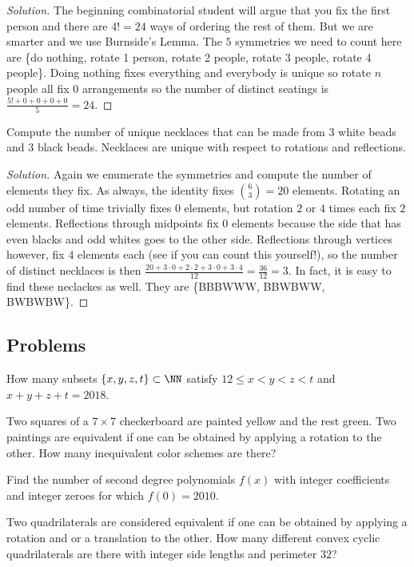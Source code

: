 \documentclass[letterpaper]{article}
\begin{document}
\begin{proof}[Solution]
The beginning combinatorial student will argue that you fix the first person and
there are $4! = 24$ ways of ordering the rest of them. But we are smarter and we
use Burnside's Lemma. The $5$ symmetries we need to count here are \{do nothing,
rotate 1 person, rotate 2 people, rotate 3 people, rotate 4 people\}. Doing
nothing fixes everything and everybody is unique so rotate $n$ people all fix
$0$ arrangements so the number of distinct seatings is $\frac{5! + 0 + 0 + 0 +
0}{5} = 24$.
\end{proof}

\begin{ex}
Compute the number of unique necklaces that can be made from $3$ white beads and
$3$ black beads. Necklaces are unique with respect to rotations and reflections.
\end{ex}

\begin{proof}[Solution]
Again we enumerate the symmetries and compute the number of elements they fix.
As always, the identity fixes $\binom{6}{3} = 20$ elements.  Rotating an odd
number of time trivially fixes $0$ elements, but rotation $2$ or $4$ times each
fix $2$ elements. Reflections through midpoints fix $0$ elements because the
side that has even blacks and odd whites goes to the other side. Reflections
through vertices however, fix $4$ elements each (see if you can count this
yourself!), so the number of distinct necklaces is then $\frac{20 + 3 \cdot 0 +
2 \cdot 2 + 3 \cdot 0 + 3 \cdot 4}{12} = \frac{36}{12} = 3$. In fact, it is easy
to find these neclackes as well. They are \{BBBWWW, BBWBWW, BWBWBW\}.
\end{proof}

\subsection{Problems}

\begin{prb}
How many subsets $\lbrace x, y, z, t \rbrace \subset \NN$ satisfy $12 \leq x < y
< z < t$ and $x + y + z + t = 2018$.
\end{prb}

\begin{prb}[1996 AIME]
Two squares of a $7 \times 7$ checkerboard are painted yellow and the rest
green. Two paintings are equivalent if one can be obtained by applying a
rotation to the other. How many inequivalent color schemes are there?
\end{prb}

\begin{prb}[2010 AIME II-10]
Find the number of second degree polynomials $f(x)$ with integer coefficients
and integer zeroes for which $f(0) = 2010$.
\end{prb}

\begin{prb}[2010 AMC 12A-25]
Two quadrilaterals are considered equivalent if one can be obtained by applying
a rotation and or a translation to the other. How many different convex cyclic
quadrilaterals are there with integer side lengths and perimeter $32$?
\end{prb}
\end{document}
